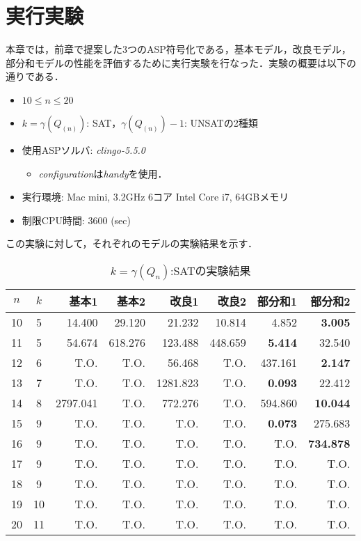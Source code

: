 \chapter{実行実験}\label{chap:experiment}
本章では，前章で提案した3つのASP符号化である，基本モデル，改良モデル，部分和モデルの性能を評価するために実行実験を行なった．実験の概要は以下の通りである．
\begin{itemize}
 \item  $10 \leq n \leq 20$
 \item $ k = \gamma(Q_(n))$: SAT，$\gamma(Q_(n))-1$: UNSATの2種類
 \item 使用ASPソルバ: \textit{clingo-5.5.0}
       \begin{itemize}
	\item \textit{configuration}は\textit{handy}を使用．
       \end{itemize}
 \item 実行環境: Mac mini, 3.2GHz 6コア Intel Core i7, 64GBメモリ
 \item 制限CPU時間: 3600 (sec)
\end{itemize}

この実験に対して，それぞれのモデルの実験結果を示す．
\begin{table}[ht]
 \caption{$k=\gamma(Q_n)$:SATの実験結果}
 \label{tb:exSAT}
 \centering
 \begin{tabular}{|c|c|r|r|r|r|r|r|} \hline
  $n$ & $k$ & 基本1 & 基本2 & 改良1 & 改良2 & 部分和1 & 部分和2 \\ \hline
  10 & 5 & 14.400 & 29.120 & 21.232 & 10.814 & 4.852 & \textbf{3.005} \\
  11 & 5 & 54.674 & 618.276 & 123.488 & 448.659 & \textbf{5.414} & 32.540 \\
  12 & 6 & T.O. & T.O. & 56.468 & T.O. & 437.161 & \textbf{2.147} \\
  13 & 7 & T.O. & T.O. & 1281.823 & T.O. & \textbf{0.093} & 22.412 \\
  14 & 8 & 2797.041 & T.O. & 772.276 & T.O. & 594.860 & \textbf{10.044}\\
  15 & 9 & T.O. & T.O. & T.O. & T.O. & \textbf{0.073} & 275.683 \\
  16 & 9 & T.O. & T.O. & T.O. & T.O. & T.O. & \textbf{734.878} \\
  17 & 9 & T.O. & T.O. & T.O. & T.O. & T.O. & T.O. \\
  18 & 9 & T.O. & T.O. & T.O. & T.O. & T.O. & T.O. \\
  19 & 10 & T.O. & T.O. & T.O. & T.O. & T.O. & T.O. \\
  20 & 11 & T.O. & T.O. & T.O. & T.O. & T.O. & T.O. \\ \hline
 \end{tabular}
\end{table}

